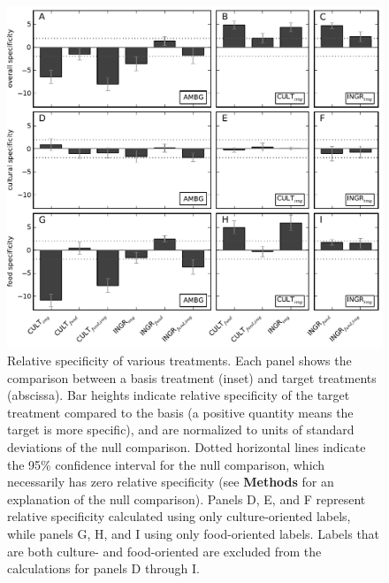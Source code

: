\documentclass[a4paper]{report}
\begin{document}
\begin{figure}
	\includegraphics{figs/specificity-allImages.pdf}
	\caption{Relative specificity of various treatments.
		Each panel shows the comparison between a basis treatment (inset) and 
		target treatments (abscissa).
		Bar heights indicate relative specificity of the target 
		treatment compared to the basis (a positive quantity means the target 
		is more specific), and are normalized to units of standard 
		deviations of the null comparison.  Dotted horizontal lines indicate
		the 95\% confidence interval for the null comparison, which necessarily
		has zero relative specificity (see \textbf{Methods} 
		for an explanation of the null comparison).  Panels D, E, and F 
		represent relative specificity calculated using only culture-oriented
		labels, while panels G, H, and I using only food-oriented labels.
		Labels that are both culture- and food-oriented are excluded from the
		calculations for panels D through I.
		}
\end{figure}
\end{document}
